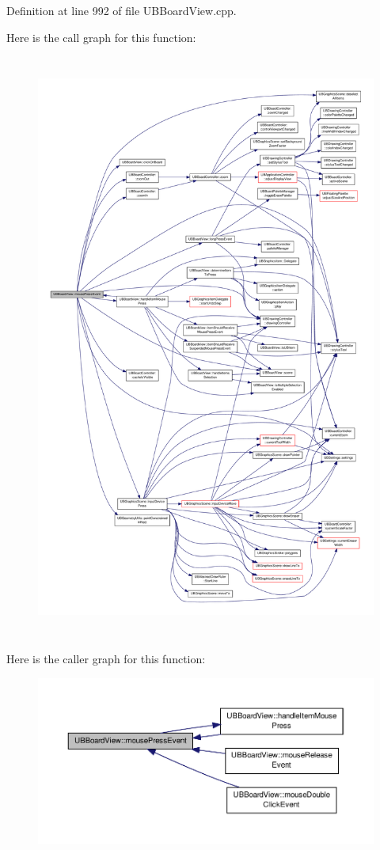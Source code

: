 Definition at line 992 of file U\-B\-Board\-View.\-cpp.



Here is the call graph for this function\-:
\nopagebreak
\begin{figure}[H]
\begin{center}
\leavevmode
\includegraphics[height=550pt]{d1/d78/class_u_b_board_view_a6fc3391590c435e0ae26c43d2bd76d14_cgraph}
\end{center}
\end{figure}




Here is the caller graph for this function\-:
\nopagebreak
\begin{figure}[H]
\begin{center}
\leavevmode
\includegraphics[width=350pt]{d1/d78/class_u_b_board_view_a6fc3391590c435e0ae26c43d2bd76d14_icgraph}
\end{center}
\end{figure}



